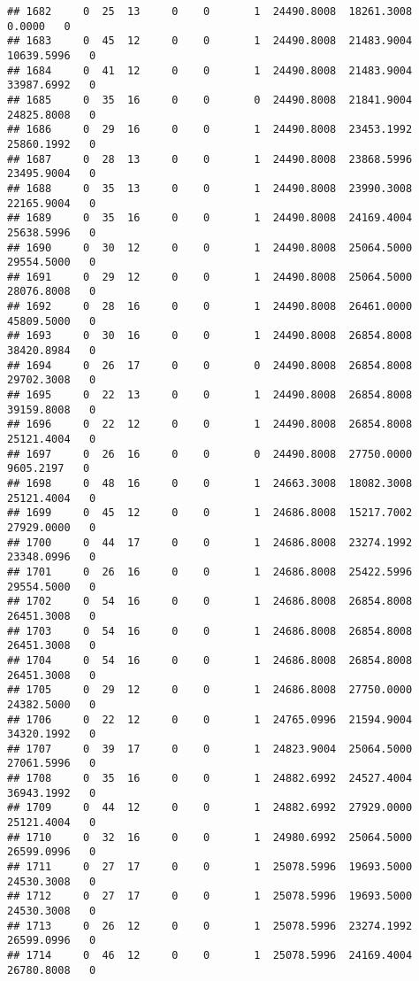 \documentclass[
]{article}
\begin{document}
\begin{enumerate}
\begin{verbatim}
## 1682     0  25  13     0    0       1  24490.8008  18261.3008      0.0000   0
## 1683     0  45  12     0    0       1  24490.8008  21483.9004  10639.5996   0
## 1684     0  41  12     0    0       1  24490.8008  21483.9004  33987.6992   0
## 1685     0  35  16     0    0       0  24490.8008  21841.9004  24825.8008   0
## 1686     0  29  16     0    0       1  24490.8008  23453.1992  25860.1992   0
## 1687     0  28  13     0    0       1  24490.8008  23868.5996  23495.9004   0
## 1688     0  35  13     0    0       1  24490.8008  23990.3008  22165.9004   0
## 1689     0  35  16     0    0       1  24490.8008  24169.4004  25638.5996   0
## 1690     0  30  12     0    0       1  24490.8008  25064.5000  29554.5000   0
## 1691     0  29  12     0    0       1  24490.8008  25064.5000  28076.8008   0
## 1692     0  28  16     0    0       1  24490.8008  26461.0000  45809.5000   0
## 1693     0  30  16     0    0       1  24490.8008  26854.8008  38420.8984   0
## 1694     0  26  17     0    0       0  24490.8008  26854.8008  29702.3008   0
## 1695     0  22  13     0    0       1  24490.8008  26854.8008  39159.8008   0
## 1696     0  22  12     0    0       1  24490.8008  26854.8008  25121.4004   0
## 1697     0  26  16     0    0       0  24490.8008  27750.0000   9605.2197   0
## 1698     0  48  16     0    0       1  24663.3008  18082.3008  25121.4004   0
## 1699     0  45  12     0    0       1  24686.8008  15217.7002  27929.0000   0
## 1700     0  44  17     0    0       1  24686.8008  23274.1992  23348.0996   0
## 1701     0  26  16     0    0       1  24686.8008  25422.5996  29554.5000   0
## 1702     0  54  16     0    0       1  24686.8008  26854.8008  26451.3008   0
## 1703     0  54  16     0    0       1  24686.8008  26854.8008  26451.3008   0
## 1704     0  54  16     0    0       1  24686.8008  26854.8008  26451.3008   0
## 1705     0  29  12     0    0       1  24686.8008  27750.0000  24382.5000   0
## 1706     0  22  12     0    0       1  24765.0996  21594.9004  34320.1992   0
## 1707     0  39  17     0    0       1  24823.9004  25064.5000  27061.5996   0
## 1708     0  35  16     0    0       1  24882.6992  24527.4004  36943.1992   0
## 1709     0  44  12     0    0       1  24882.6992  27929.0000  25121.4004   0
## 1710     0  32  16     0    0       1  24980.6992  25064.5000  26599.0996   0
## 1711     0  27  17     0    0       1  25078.5996  19693.5000  24530.3008   0
## 1712     0  27  17     0    0       1  25078.5996  19693.5000  24530.3008   0
## 1713     0  26  12     0    0       1  25078.5996  23274.1992  26599.0996   0
## 1714     0  46  12     0    0       1  25078.5996  24169.4004  26780.8008   0

\end{verbatim}
\end{enumerate}
\end{document}
